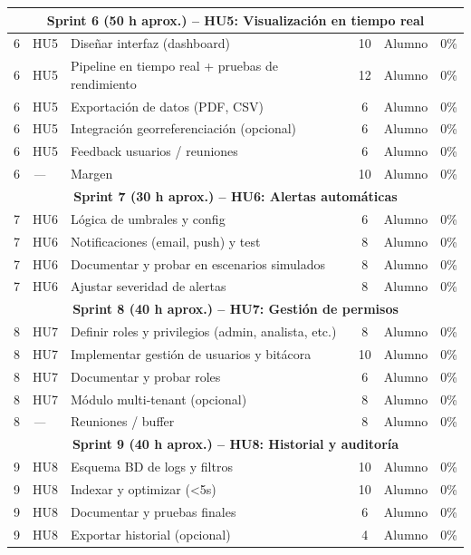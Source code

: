 \documentclass[
11pt, %
]{ProyectoVpC}
\begin{document}
\begin{center}
\begin{tabular}{|l|l|l|c|l|c|}
\hline
\multicolumn{6}{|c|}{\textbf{Sprint 6 (50 h aprox.) -- HU5: Visualización en tiempo real}} \\
\hline
6 & HU5 & Diseñar interfaz (dashboard) & 10 & Alumno & 0\% \\
6 & HU5 & Pipeline en tiempo real + pruebas de rendimiento & 12 & Alumno & 0\% \\
6 & HU5 & Exportación de datos (PDF, CSV) & 6 & Alumno & 0\% \\
6 & HU5 & Integración georreferenciación (opcional) & 6 & Alumno & 0\% \\
6 & HU5 & Feedback usuarios / reuniones & 6 & Alumno & 0\% \\
6 & \textit{---} & Margen & 10 & Alumno & 0\% \\
\hline
\multicolumn{6}{|c|}{\textbf{Sprint 7 (30 h aprox.) -- HU6: Alertas automáticas}} \\
\hline
7 & HU6 & Lógica de umbrales y config & 6 & Alumno & 0\% \\
7 & HU6 & Notificaciones (email, push) y test & 8 & Alumno & 0\% \\
7 & HU6 & Documentar y probar en escenarios simulados & 8 & Alumno & 0\% \\
7 & HU6 & Ajustar severidad de alertas & 8 & Alumno & 0\% \\
\hline
\multicolumn{6}{|c|}{\textbf{Sprint 8 (40 h aprox.) -- HU7: Gestión de permisos}} \\
\hline
8 & HU7 & Definir roles y privilegios (admin, analista, etc.) & 8 & Alumno & 0\% \\
8 & HU7 & Implementar gestión de usuarios y bitácora & 10 & Alumno & 0\% \\
8 & HU7 & Documentar y probar roles & 6 & Alumno & 0\% \\
8 & HU7 & Módulo multi-tenant (opcional) & 8 & Alumno & 0\% \\
8 & \textit{---} & Reuniones / buffer & 8 & Alumno & 0\% \\
\hline
\multicolumn{6}{|c|}{\textbf{Sprint 9 (40 h aprox.) -- HU8: Historial y auditoría}} \\
\hline
9 & HU8 & Esquema BD de logs y filtros & 10 & Alumno & 0\% \\
9 & HU8 & Indexar y optimizar (<5s) & 10 & Alumno & 0\% \\
9 & HU8 & Documentar y pruebas finales & 6 & Alumno & 0\% \\
9 & HU8 & Exportar historial (opcional) & 4 & Alumno & 0\% \\

\end{tabular}
\end{center}
\end{document}
